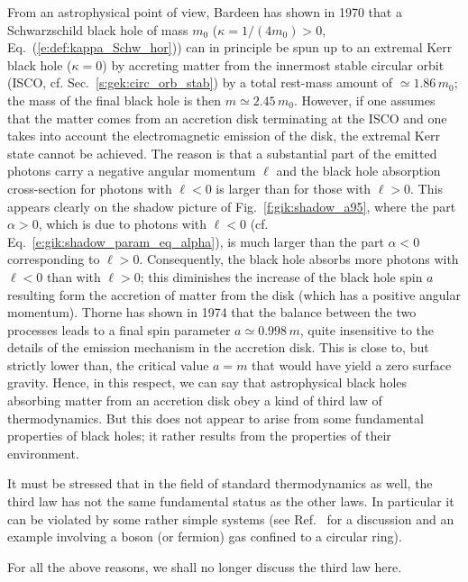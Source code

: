 From an astrophysical point of view, Bardeen has shown in 1970 \cite{Barde70a}
that a Schwarzschild black hole
of mass $m_0$ ($\kappa = 1/(4m_0) > 0$, Eq.~(\ref{e:def:kappa_Schw_hor}))
can in principle be spun up to an extremal Kerr black hole
($\kappa = 0$)
by accreting matter from the
innermost stable circular orbit
(ISCO, cf. Sec.~\ref{s:gek:circ_orb_stab}) by a total rest-mass amount of
$\simeq 1.86\, m_0$; the mass of the final black hole is then $m \simeq 2.45\, m_0$.
However, if one assumes that the matter comes from an accretion disk
terminating at the ISCO and
one takes into account the electromagnetic emission of the disk, the extremal Kerr state
cannot be achieved. The reason is that a substantial part of the emitted photons carry a negative angular momentum $\ell$ and
the black hole absorption cross-section for photons with $\ell<0$ is larger than for those with
$\ell>0$. This appears clearly on the shadow picture of Fig.~\ref{f:gik:shadow_a95},
where the part $\alpha>0$, which is due to photons
with $\ell < 0$ (cf. Eq.~\ref{e:gik:shadow_param_eq_alpha}), is much larger than the part $\alpha<0$
corresponding to $\ell > 0$. Consequently, the black hole absorbs more photons with $\ell < 0$
than with $\ell>0$; this diminishes the increase of the black hole spin $a$ resulting form the accretion of  matter from the disk (which has a positive angular momentum). Thorne has shown in 1974 \cite{Thorn74} that the balance between the two processes leads to a final spin parameter $a \simeq 0.998 \, m$, quite insensitive to the details
of the emission mechanism in the accretion disk. This is close to, but strictly lower than, the critical
value $a = m$ that would have yield a zero surface gravity. Hence, in this respect, we can say that
astrophysical black holes absorbing matter from an accretion disk obey a kind of third law of thermodynamics.
But this does not appear to arise from some fundamental properties of black holes; it rather results from the properties of their environment.

It must be stressed that in the field of standard thermodynamics as well, the third law has not the same fundamental status as the other laws.
In particular it can be violated by some rather simple systems (see Ref.~\cite{Wald97} for a discussion and an example involving a boson (or fermion) gas confined to a circular ring).

For all the above reasons, we shall no longer discuss the third law here.


